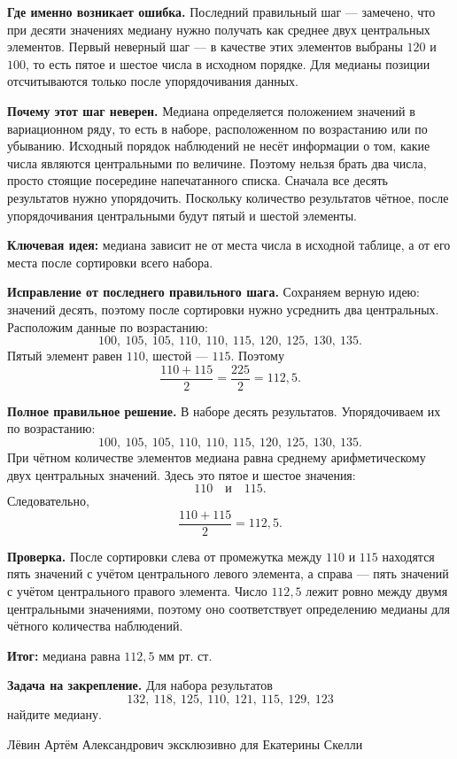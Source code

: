 \documentclass[12pt,a4paper]{article}
\begin{document}
\textbf{Где именно возникает ошибка.} Последний правильный шаг --- замечено, что при десяти значениях медиану нужно получать как среднее двух центральных элементов. Первый неверный шаг --- в качестве этих элементов выбраны $120$ и $100$, то есть пятое и шестое числа в исходном порядке. Для медианы позиции отсчитываются только после упорядочивания данных.

\textbf{Почему этот шаг неверен.} Медиана определяется положением значений в вариационном ряду, то есть в наборе, расположенном по возрастанию или по убыванию. Исходный порядок наблюдений не несёт информации о том, какие числа являются центральными по величине. Поэтому нельзя брать два числа, просто стоящие посередине напечатанного списка. Сначала все десять результатов нужно упорядочить. Поскольку количество результатов чётное, после упорядочивания центральными будут пятый и шестой элементы.

\textcolor{blue!60!black}{\textbf{Ключевая идея:}} медиана зависит не от места числа в исходной таблице, а от его места после сортировки всего набора.

\textbf{Исправление от последнего правильного шага.} Сохраняем верную идею: значений десять, поэтому после сортировки нужно усреднить два центральных. Расположим данные по возрастанию:
\[
100,\ 105,\ 105,\ 110,\ 110,\ 115,\ 120,\ 125,\ 130,\ 135.
\]
Пятый элемент равен $110$, шестой --- $115$. Поэтому
\[
\frac{110+115}{2}=\frac{225}{2}=112{,}5.
\]

\textbf{Полное правильное решение.} В наборе десять результатов. Упорядочиваем их по возрастанию:
\[
100,\ 105,\ 105,\ 110,\ 110,\ 115,\ 120,\ 125,\ 130,\ 135.
\]
При чётном количестве элементов медиана равна среднему арифметическому двух центральных значений. Здесь это пятое и шестое значения:
\[
110 \quad \text{и} \quad 115.
\]
Следовательно,
\[
\frac{110+115}{2}=112{,}5.
\]

\textbf{Проверка.} После сортировки слева от промежутка между $110$ и $115$ находятся пять значений с учётом центрального левого элемента, а справа --- пять значений с учётом центрального правого элемента. Число $112{,}5$ лежит ровно между двумя центральными значениями, поэтому оно соответствует определению медианы для чётного количества наблюдений.

\textcolor{teal!60!black}{\textbf{Итог:}} медиана равна $112{,}5$ мм рт. ст.

\textbf{Задача на закрепление.} Для набора результатов
\[
132,\ 118,\ 125,\ 110,\ 121,\ 115,\ 129,\ 123
\]
найдите медиану.

\vfill
\begin{center}
\small Лёвин Артём Александрович эксклюзивно для Екатерины Скелли
\end{center}
\end{document}
